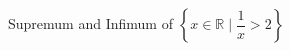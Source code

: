 \documentclass[preview]{standalone}
\begin{document}
\begin{center}
Supremum and Infimum of $\left\{ x \in \mathbb{R} \mid \dfrac{1}{x} > 2 \right\}$
\end{center}
\end{document}
